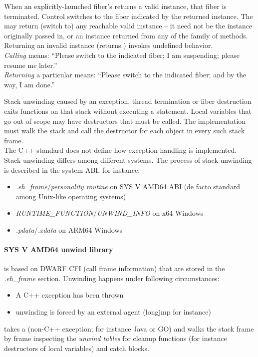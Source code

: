 When an explicitly-launched fiber's \entryfn returns a valid \fiber
instance, that fiber is terminated. Control switches to the fiber indicated by
the returned \fiber instance. The \entryfn may return (switch to) any
reachable valid \fiber instance -- it need not be the instance originally
passed in, or an instance returned from any of the \resume family of
methods.\\

Returning an invalid \fiber instance (\opbool returns ) invokes
undefined behavior.\\

\emph{Calling} \resume means: ``Please switch to the indicated fiber; I
am suspending; please resume me later.''\\

\emph{Returning} a particular \fiber means: ``Please switch to the indicated
fiber; and by the way, I am done.''


\label{unwinding}

Stack unwinding caused by an exception, thread termination or fiber
destruction exits functions on that stack without executing a  statement. Local variables
that go out of scope may have destructors that must be called.
The implementation must walk the stack and call the destructor for each object
in every such stack frame.\\

The C++ standard does not define how exception handling is implemented. Stack unwinding differs
among different systems. The process of stack unwinding is described in the
system ABI, for instance:
\begin{itemize}
    \item \emph{.eh\_frame}/\emph{personality routine} on SYS V AMD64 ABI\cite{SYSVAMD64} (de facto standard among Unix-like operating systems)
    \item \emph{RUNTIME\_FUNCTION}/\emph{UNWIND\_INFO} on x64 Windows\cite{WinX64}
    \item \emph{.pdata}/\emph{.xdata} on ARM64 Windows\cite{WinARM64}
\end{itemize}

\paragraph{SYS V AMD64 unwind library}
is based on DWARF CFI (call frame information) that are stored in the \emph{.eh\_frame} section.
Unwinding happens under following circumstances:
\begin{itemize}
    \item A C++ exception has been thrown
    \item unwinding is forced by an external agent (longjmp for instance)
\end{itemize}
\uwforced takes a \foreignex (non-C++ exception; for instance Java or GO) and walks the stack frame by frame
inspecting the \emph{unwind tables} for cleanup functions (for instance destructors of
local variables) and catch blocks.\\

